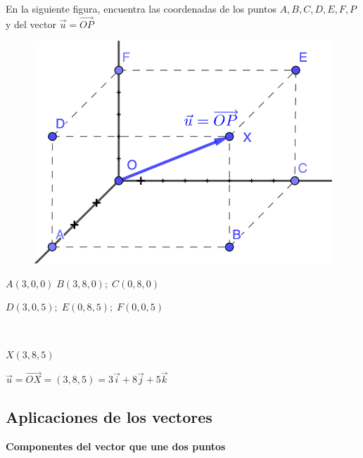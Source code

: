\begin{ejem}

En la siguiente figura, encuentra las coordenadas de los puntos $A,B,C,D,E,F,P$ y del vector $\vec u=\overrightarrow{OP}$	
\end{ejem}


\begin{multicols}{2}

	\begin{figure}[H]
	\centering
	\includegraphics[width=.50\textwidth]{imagenes/imagenes09/T09IM08.png}
	\end{figure}
	
	\textcolor{gris}{$A(3,0,0)\; B(3,8,0); \; C(0,8,0)$}
	
	\textcolor{gris}{$D(3,0,5);\; E(0,8,5); \; F(0,0,5)$}
	
	$\quad$
	
	\textcolor{gris}{$X(3,8,5)$}
	
	\textcolor{gris}{$\vec u=\overrightarrow{OX}=(3,8,5)=3\vec i+8\vec j+5 \vec k$}

\end{multicols}

\subsection{Aplicaciones de los vectores}

\textbf{Componentes del vector que une dos puntos}

